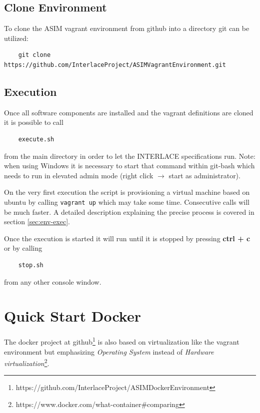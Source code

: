 \subsection{Clone Environment}

To clone the ASIM vagrant environment from github into a directory git can be utilized:

\begin{lstlisting}
	git clone https://github.com/InterlaceProject/ASIMVagrantEnvironment.git
\end{lstlisting}

\subsection{Execution}

Once all software components are installed and the vagrant definitions are cloned it is possible to call

\begin{lstlisting}
	execute.sh
\end{lstlisting}

from the main directory in order to let the INTERLACE specifications run. Note: when using Windows it is necessary to start that command within git-bash which needs to run in elevated admin mode (right click $\rightarrow$ start as administrator).

On the very first execution the script is provisioning a virtual machine based on ubuntu by calling \texttt{vagrant up} which may take some time. Consecutive calls will be much faster. A detailed description explaining the precise process is covered in section \ref{sec:env-exec}.

Once the execution is started it will run until it is stopped by pressing \textbf{ctrl + c} or by calling

\begin{lstlisting}
	stop.sh
\end{lstlisting}

from any other console window.

\section{Quick Start Docker}
\label{sec:quick-start-docker}

The docker project at github\footnote{https://github.com/InterlaceProject/ASIMDockerEnvironment} is also based on virtualization like the vagrant environment but emphasizing \textit{Operating System} instead of \textit{Hardware virtualization}\footnote{https://www.docker.com/what-container\#comparing}.

